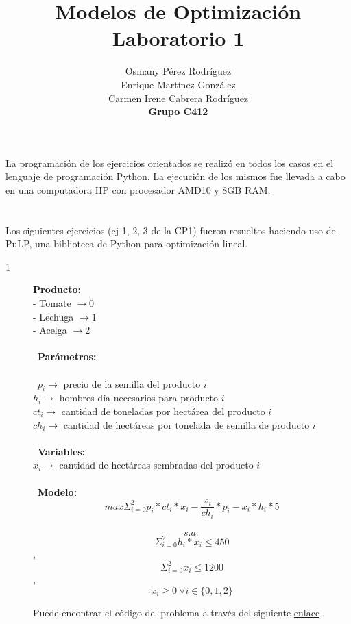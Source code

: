 \documentclass[titlepage, 11pt]{scrartcl}
\title{
    \normalfont\normalsize
    {\huge Modelos de Optimización\\
    		\textbf{Laboratorio 1}}
    \vspace{12pt}
}
\author{Osmany P\'erez Rodr\'iguez\\
		Enrique Mart\'inez Gonz\'alez\\
		Carmen Irene Cabrera Rodr\'iguez\\
		\textbf{Grupo C412}}
\date{}
\begin{document}
    \maketitle 
    
	La programaci\'on de los ejercicios orientados se realiz\'o en todos los casos en el lenguaje de programaci\'on Python. La ejecuci\'on de los mismos fue llevada a cabo en una computadora HP con procesador AMD10 y 8GB RAM.
    \section{}{
		Los siguientes ejercicios (ej 1, 2, 3 de la CP1) fueron resueltos haciendo uso de PuLP, una biblioteca de Python para optimizaci\'on lineal.
    	\begin{description}
    		\item[1]
    		
    		 \textbf{Producto:}\\
    		- Tomate $\rightarrow 0$\\
    		- Lechuga $\rightarrow 1$\\
    		- Acelga $\rightarrow 2$\\
    		\\\
    		\textbf{Parámetros:}\\        
    		\\\
    		$p_i  \rightarrow $ precio de la semilla del producto $i$\\
    		$h_i \rightarrow $ hombres-día necesarios para producto $i$\\
    		$ct_i \rightarrow$ cantidad de toneladas por hectárea del producto $i$\\
    		$ch_i \rightarrow$ cantidad de hectáreas por tonelada de semilla de producto $i$\\
    		\\\
    		\textbf{Variables:}\\
    		$x_i \rightarrow$ cantidad de hectáreas sembradas del producto $i$\\
    		\\\
    		\textbf{Modelo:}\\
    		$$max  \Sigma_{i=0}^{2} p_i * ct_i*x_i - \frac{x_i}{ch_i}*p_i  - x_i*h_i*5$$\\
    		
    		$$s.a:$$
    		$$ \Sigma_{i=0}^{2} h_i *x_i \leq 450$$,
    		$$\Sigma_{i=0}^{2} x_i \leq 1200$$, 
    		$$x_i \geq 0  \ \forall i \in \{0,1,2\} $$
    	
    		Puede encontrar el c\'odigo del problema a trav\'es del siguiente \href{lab1ex1.py}{enlace}
    		

\end{description}}
\end{document}
